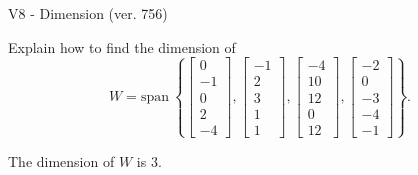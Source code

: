 \begin{exercise}
  \begin{exerciseTitle}V8 - Dimension (ver. 756)\end{exerciseTitle}
  \begin{exerciseStatement}
    Explain how to find the dimension of 
\[W=\mathrm{span}\ \left\{\left[\begin{array}{r}
0 \\
-1 \\
0 \\
2 \\
-4
\end{array}\right] , \left[\begin{array}{r}
-1 \\
2 \\
3 \\
1 \\
1
\end{array}\right] , \left[\begin{array}{r}
-4 \\
10 \\
12 \\
0 \\
12
\end{array}\right] , \left[\begin{array}{r}
-2 \\
0 \\
-3 \\
-4 \\
-1
\end{array}\right]\right\}.\]



  \end{exerciseStatement}
  \begin{exerciseAnswer}
   The dimension of \(W\) is  \(3\).
  


  \end{exerciseAnswer}
\end{exercise}